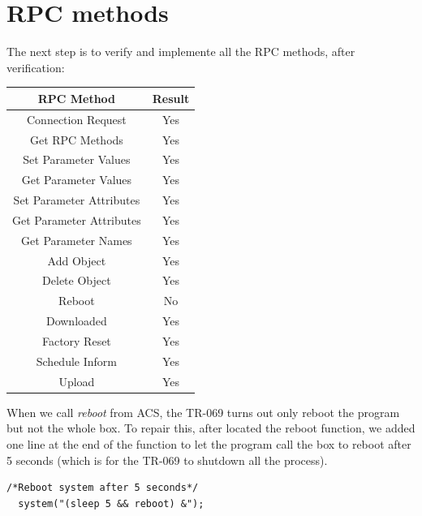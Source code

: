 \section{RPC methods}
The next step is to verify and implemente all the RPC methods, after verification:
\begin{center}
  \begin{tabular}{@{} cc @{}}
    \toprule
    RPC Method & Result \\*
    \midrule
    Connection Request & Yes \\
    Get RPC Methods & Yes \\
    Set Parameter Values  & Yes\\
    Get Parameter Values  & Yes\\
    Set Parameter Attributes  & Yes\\
    Get Parameter Attributes  & Yes\\
    Get Parameter Names & Yes\\
    Add Object  & Yes\\
    Delete Object & Yes\\
    Reboot & No\\
    Downloaded  & Yes\\
    Factory Reset & Yes\\
    Schedule Inform & Yes\\
    Upload & Yes\\
    \bottomrule
  \end{tabular}
\end{center}

When we call \textit{reboot} from ACS, the TR-069 turns out only reboot the program but not the whole box. To repair this, after located the reboot function, we added one line at the end of the function to let the program call the box to reboot after 5 seconds (which is for the TR-069 to shutdown all the process).
\begin{lstlisting}[mathescape]
  /*Reboot system after 5 seconds*/
  system("(sleep 5 && reboot) &");
\end{lstlisting}
